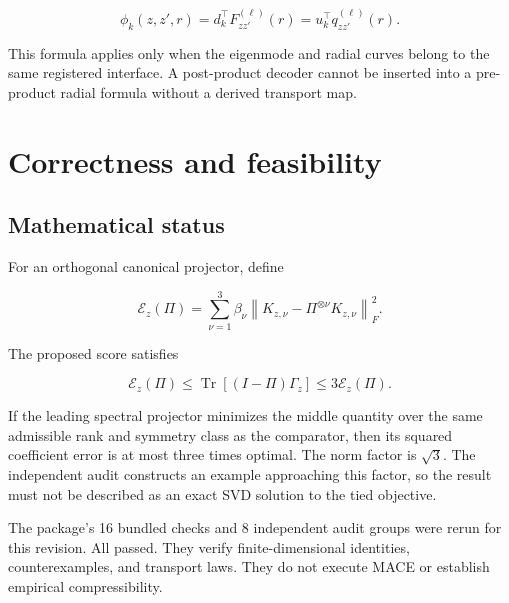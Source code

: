 \documentclass[10pt,twocolumn]{article}
\begin{document}
\begin{equation}
\phi_k(z,z',r)=d_k^\top F_{zz'}^{(\ell)}(r)
=u_k^\top q_{zz'}^{(\ell)}(r).
\label{eq:mode-image}
\end{equation}

This formula applies only when the eigenmode and radial curves belong to the same registered interface. A post-product decoder cannot be inserted into a pre-product radial formula without a derived transport map.

\section{Correctness and feasibility}

\subsection{Mathematical status}

For an orthogonal canonical projector, define

\begin{equation}
\mathcal E_z(\Pi)=\sum_{\nu=1}^{3}\beta_\nu
\left\lVert K_{z,\nu}-
\Pi^{\otimes\nu}K_{z,\nu}\right\rVert_F^2.
\label{eq:error}
\end{equation}

The proposed score satisfies

\begin{equation}
\mathcal E_z(\Pi)
\leq
\operatorname{Tr}\left[(I-\Pi)\Gamma_z\right]
\leq 3\mathcal E_z(\Pi).
\label{eq:sandwich}
\end{equation}

If the leading spectral projector minimizes the middle quantity over the same admissible rank and symmetry class as the comparator, then its squared coefficient error is at most three times optimal. The norm factor is $\sqrt{3}$. The independent audit constructs an example approaching this factor, so the result must not be described as an exact SVD solution to the tied objective.

The package's 16 bundled checks and 8 independent audit groups were rerun for this revision. All passed. They verify finite-dimensional identities, counterexamples, and transport laws. They do not execute MACE or establish empirical compressibility.
\end{document}
